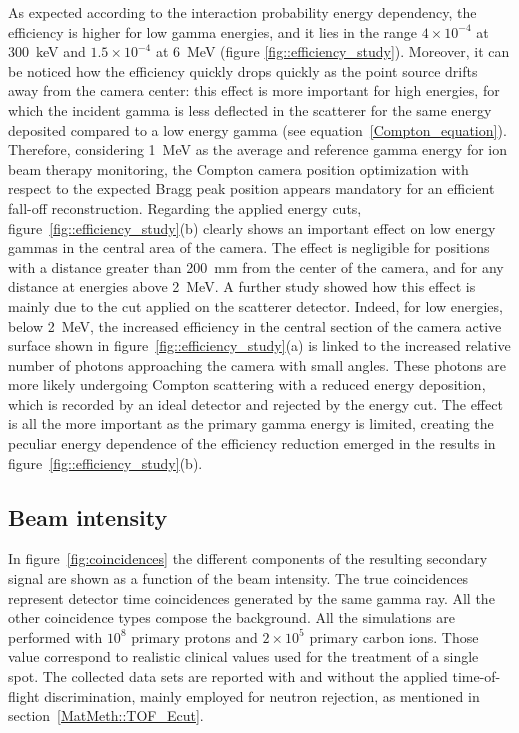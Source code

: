 As expected according to the interaction probability energy dependency, the efficiency is higher for low gamma energies, and it lies in the range $4\times10^{-4}$ at 300~keV and $1.5\times10^{-4}$ at 6~MeV (figure \ref{fig::efficiency_study}). Moreover, it can be noticed how the efficiency quickly drops quickly as the point source drifts away from the camera center: this effect is more important for high energies, for which the incident gamma is less deflected in the scatterer for the same energy deposited compared to a low energy gamma (see equation~\ref{Compton_equation}). Therefore, considering 1~MeV as the average and reference gamma energy for ion beam therapy monitoring, the Compton camera position optimization with respect to the expected Bragg peak position appears mandatory for an efficient fall-off reconstruction.\newline
Regarding the applied energy cuts, figure~\ref{fig::efficiency_study}(b) clearly shows an important effect on low energy gammas in the central area of the camera. The effect is negligible for positions with a distance greater than 200~mm from the center of the camera, and for any distance at energies above 2~MeV. A further study showed how this effect is mainly due to the cut applied on the scatterer detector. Indeed, for low energies, below 2~MeV, the increased efficiency in the central section of the camera active surface shown in figure~\ref{fig::efficiency_study}(a) is linked to the increased relative number of photons approaching the camera with small angles. These photons are more likely undergoing Compton scattering with a reduced energy deposition, which is recorded by an ideal detector and rejected by the energy cut. The effect is all the more important as the primary gamma energy is limited, creating the peculiar energy dependence of the efficiency reduction emerged in the results in figure~\ref{fig::efficiency_study}(b).
 

\subsection{Beam intensity}
\label{Results::beamInt}


 
In figure~\ref{fig:coincidences} the different components of the resulting secondary signal are shown as a function of the beam intensity. The true coincidences represent detector time coincidences generated by the same gamma ray. All the other coincidence types compose the background. All the simulations are performed with $10^{8}$ primary protons and  $2\times10^{5}$ primary carbon ions. Those value correspond to realistic clinical values used for the treatment of a single spot. The collected data sets are reported with and without the applied time-of-flight discrimination, mainly employed for neutron rejection, as mentioned in section~\ref{MatMeth::TOF_Ecut}.


